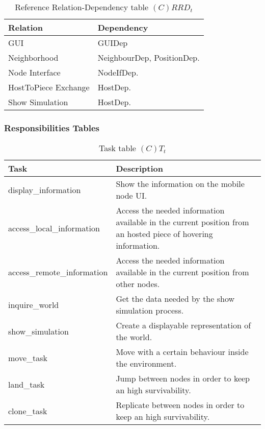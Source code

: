 \begin{table}[H]
	\centering
	\begin{tabular}{|p{4cm}|p{8cm}|}
			\hline
			\textbf{Relation} & \textbf{Dependency} \\
			\hline
			GUI & GUIDep \\
			\hline
			Neighborhood & NeighbourDep, PositionDep. \\
			\hline
			Node Interface & NodeIfDep. \\
			\hline
			HostToPiece Exchange & HostDep. \\
			\hline
			Show Simulation & HostDep. \\
			\hline
		\end{tabular}
	\caption{Reference Relation-Dependency table $(C)RRD_t$}
	\label{tab:crrdt}
\end{table}

\subsubsection{Responsibilities Tables}

\begin{table}[H]
	\centering
	\begin{tabular}{|p{5cm}|p{7cm}|}
			\hline
			\textbf{Task} & \textbf{Description} \\
			\hline
			display\_information & Show the information on the mobile node UI.\\
			\hline
			access\_local\_information & Access the needed information available in the
			current position from an hosted piece of hovering information.\\
			\hline
			access\_remote\_information & Access the needed information available in the
			current position from other nodes.\\
			\hline
			inquire\_world & Get the data needed by the show simulation process.  \\
			\hline
			show\_simulation & Create a displayable representation of the world. \\
			\hline
			move\_task & Move with a certain behaviour inside the environment. \\
			\hline
			land\_task & Jump between nodes in order to keep an high survivability. \\
			\hline
			clone\_task & Replicate between nodes in order to keep an high survivability. \\
			\hline
		\end{tabular}
	\caption{Task table $(C)T_t$}
	\label{tab:ctt}
\end{table}

